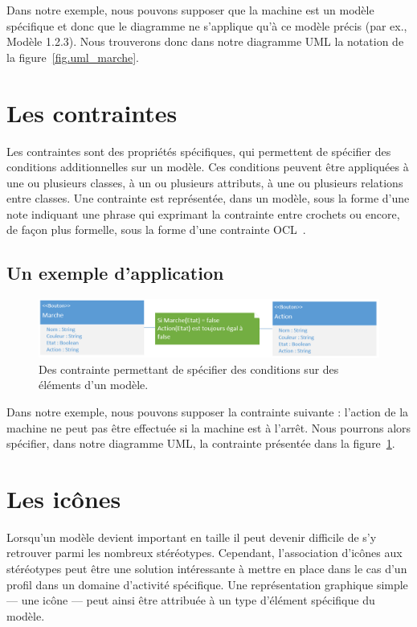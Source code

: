 Dans notre exemple, nous pouvons supposer que la machine est un modèle spécifique et donc que le diagramme ne s'applique qu'à ce modèle précis (par ex., Modèle 1.2.3).
Nous trouverons donc dans notre diagramme UML la notation de la figure~\ref{fig.uml_marche}.



\section{Les contraintes}
Les contraintes sont des propriétés spécifiques, qui permettent de sp\'ecifier des conditions additionnelles sur un modèle.
Ces conditions peuvent être appliquées à une ou plusieurs classes, à un ou plusieurs attributs, à une ou plusieurs relations entre classes.
Une contrainte est représent\'ee, dans un modèle, sous la forme d'une note indiquant une phrase qui exprimant la contrainte entre crochets ou encore, de fa\c{c}on plus formelle, sous la forme d'une contrainte OCL~\cite{OCL}.

\subsection{Un exemple d'application}

\begin{figure}
    \begin{center}
    \includegraphics[width=12cm]{10_img/chap4/constraint.PNG}
    \caption{Des contrainte permettant de sp\'ecifier des conditions sur des \'el\'ements d'un modèle.}
    \label{fig.uml_con}
    \end{center}
\end{figure}

Dans notre exemple, nous pouvons supposer la contrainte suivante : l'action de la machine ne peut pas être effectuée si la machine est à l'arrêt.
Nous pourrons alors sp\'ecifier, dans notre diagramme UML, la contrainte présent\'ee dans la figure~\ref{fig.uml_con}.


\section{Les ic\^ones}
Lorsqu'un modèle devient important en taille il peut devenir difficile de s'y retrouver parmi les nombreux st\'er\'eotypes.
Cependant, l'association d'ic\^ones aux st\'er\'eotypes peut être une solution int\'eressante à mettre en place dans le cas d'un profil dans un domaine d'activité spécifique.
Une représentation graphique simple --- une ic\^one --- peut ainsi être attribuée à un type d'élément spécifique du modèle.


